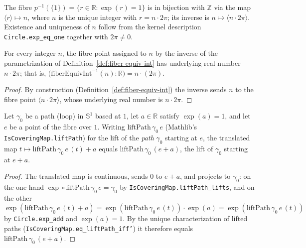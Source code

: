 \begin{definition}
    \label{def:fiber-equiv-int}
    \leanok
    The fibre \(p^{-1}(\{1\}) = \{r \in \mathbb{R} : \exp(r) = 1\}\) is in bijection with
    \(\mathbb{Z}\) via the map \(\langle r\rangle \mapsto n\), where \(n\) is the unique
    integer with \(r = n \cdot 2\pi\); its inverse is \(n \mapsto \langle n \cdot 2\pi\rangle\).
    Existence and uniqueness of \(n\) follow from the kernel description
    \texttt{Circle.exp\_eq\_one} together with \(2\pi \neq 0\).
\end{definition}

\begin{lemma}
    \label{lem:fiber-equiv-int-symm}
    \leanok
    For every integer \(n\), the fibre point assigned to \(n\) by the inverse of the parametrization
    of Definition~\ref{def:fiber-equiv-int} has underlying real number \(n\cdot 2\pi\); that is,
    \(\bigl(\mathrm{fiberEquivInt}^{-1}(n) : \mathbb{R}\bigr) = n\cdot(2\pi)\).
\end{lemma}
\begin{proof}
    By construction (Definition~\ref{def:fiber-equiv-int}) the inverse sends \(n\) to the fibre point
    \(\langle n\cdot 2\pi\rangle\), whose underlying real number is \(n\cdot 2\pi\).
\end{proof}

\begin{lemma}
    \label{lem:translated-lift-is-lift}
    \leanok
    Let \(\gamma_0\) be a path (loop) in \(\mathbb{S}^1\) based at \(1\), let \(a \in \mathbb{R}\)
    satisfy \(\exp(a) = 1\), and let \(e\) be a point of the fibre over \(1\). Writing
    \(\mathrm{liftPath}\,\gamma_0\,e\) (Mathlib's \texttt{IsCoveringMap.liftPath}) for the lift of the
    \emph{path} \(\gamma_0\) starting at \(e\), the translated map
    \(t \mapsto \mathrm{liftPath}\,\gamma_0\,e\,(t) + a\) equals \(\mathrm{liftPath}\,\gamma_0\,(e + a)\),
    the lift of \(\gamma_0\) starting at \(e + a\).
\end{lemma}
\begin{proof}
    The translated map is continuous, sends \(0\) to \(e + a\), and projects to \(\gamma_0\): on the
    one hand \(\exp\circ\mathrm{liftPath}\,\gamma_0\,e = \gamma_0\) by
    \texttt{IsCoveringMap.liftPath\_lifts}, and on the other
    \(\exp(\mathrm{liftPath}\,\gamma_0\,e\,(t) + a) = \exp(\mathrm{liftPath}\,\gamma_0\,e\,(t))\cdot\exp(a)
    = \exp(\mathrm{liftPath}\,\gamma_0\,e\,(t))\) by \texttt{Circle.exp\_add} and \(\exp(a) = 1\). By the
    unique characterization of lifted paths (\texttt{IsCoveringMap.eq\_liftPath\_iff'}) it therefore
    equals \(\mathrm{liftPath}\,\gamma_0\,(e + a)\).
\end{proof}

